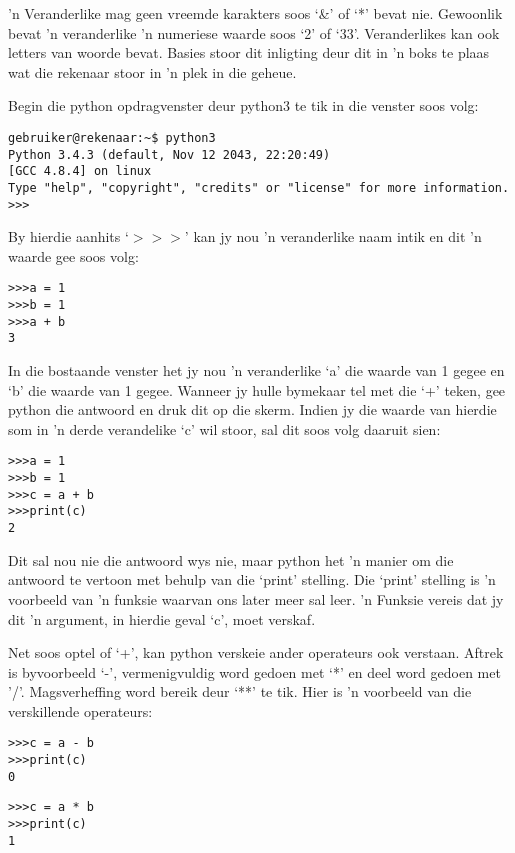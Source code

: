 'n Veranderlike mag geen vreemde karakters soos `\&' of `*' bevat nie.  Gewoonlik bevat 'n veranderlike 'n numeriese waarde soos `2' of `33'.  Veranderlikes kan ook letters van woorde bevat.  Basies stoor dit inligting deur dit in 'n boks te plaas wat die rekenaar stoor in 'n plek in die geheue. 

Begin die python opdragvenster deur python3 te tik in die venster soos volg:

\begin{lstlisting}[style=DOS]
gebruiker@rekenaar:~$ python3
Python 3.4.3 (default, Nov 12 2043, 22:20:49) 
[GCC 4.8.4] on linux
Type "help", "copyright", "credits" or "license" for more information.
>>>
\end{lstlisting}

By hierdie aanhits `$>>>$' kan jy nou 'n veranderlike naam intik en dit 'n waarde gee soos volg:

\begin{lstlisting}[style=DOS]
>>>a = 1
>>>b = 1
>>>a + b
3
\end{lstlisting}

In die bostaande venster het jy nou 'n veranderlike `a' die waarde van 1 gegee en `b' die waarde van 1 gegee.  Wanneer jy hulle bymekaar tel met die `+' teken, gee python die antwoord en druk dit op die skerm.  Indien jy die waarde van hierdie som in 'n derde verandelike `c' wil stoor, sal dit soos volg daaruit sien:

\begin{lstlisting}[style=DOS]
>>>a = 1
>>>b = 1
>>>c = a + b
>>>print(c)
2
\end{lstlisting}

Dit sal nou nie die antwoord wys nie, maar python het 'n manier om die antwoord te vertoon met behulp van die `print' stelling.  Die `print' stelling is 'n voorbeeld van 'n funksie waarvan ons later meer sal leer.  'n Funksie vereis dat jy dit 'n argument, in hierdie geval `c', moet verskaf.

Net soos optel of `+', kan python verskeie ander operateurs ook verstaan.  Aftrek is byvoorbeeld `-', vermenigvuldig word gedoen met `*' en deel word gedoen met '/'.  Magsverheffing word bereik deur `**' te tik.  Hier is 'n voorbeeld van die verskillende operateurs:

\begin{lstlisting}[style=DOS]
>>>c = a - b
>>>print(c)
0
\end{lstlisting}


\begin{lstlisting}[style=DOS]
>>>c = a * b
>>>print(c)
1
\end{lstlisting}


